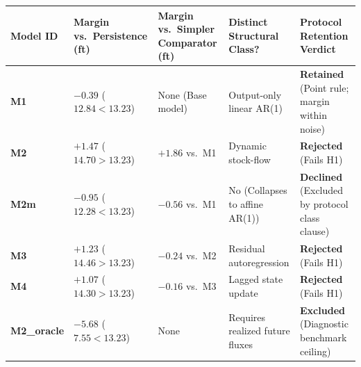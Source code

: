 \documentclass[11pt]{article}
\begin{document}
{\def\LTcaptype{none} %
\begin{longtable}[]{@{}
  >{\raggedright\arraybackslash}p{}
  >{\centering\arraybackslash}p{}
  >{\centering\arraybackslash}p{}
  >{\centering\arraybackslash}p{}
  >{\raggedright\arraybackslash}p{}@{}}
\toprule\noalign{}
\begin{minipage}[b]{\linewidth}\raggedright
Model ID
\end{minipage} & \begin{minipage}[b]{\linewidth}\centering
Margin vs.~Persistence (ft)
\end{minipage} & \begin{minipage}[b]{\linewidth}\centering
Margin vs.~Simpler Comparator (ft)
\end{minipage} & \begin{minipage}[b]{\linewidth}\centering
Distinct Structural Class?
\end{minipage} & \begin{minipage}[b]{\linewidth}\raggedright
Protocol Retention Verdict
\end{minipage} \\
\midrule\noalign{}
\endhead
\bottomrule\noalign{}
\endlastfoot
\textbf{M1} & \(-0.39\) (\(12.84 < 13.23\)) & None (Base model) &
Output-only linear AR(1) & \textbf{Retained} (Point rule; margin within
noise) \\
\textbf{M2} & \(+1.47\) (\(14.70 > 13.23\)) & \(+1.86\) vs.~M1 & Dynamic
stock-flow & \textbf{Rejected} (Fails H1) \\
\textbf{M2m} & \(-0.95\) (\(12.28 < 13.23\)) & \(-0.56\) vs.~M1 & No
(Collapses to affine AR(1)) & \textbf{Declined} (Excluded by protocol
class clause) \\
\textbf{M3} & \(+1.23\) (\(14.46 > 13.23\)) & \(-0.24\) vs.~M2 &
Residual autoregression & \textbf{Rejected} (Fails H1) \\
\textbf{M4} & \(+1.07\) (\(14.30 > 13.23\)) & \(-0.16\) vs.~M3 & Lagged
state update & \textbf{Rejected} (Fails H1) \\
\textbf{M2\_oracle} & \(-5.68\) (\(7.55 < 13.23\)) & None & Requires
realized future fluxes & \textbf{Excluded} (Diagnostic benchmark
ceiling) \\
\end{longtable}
}
\end{document}
